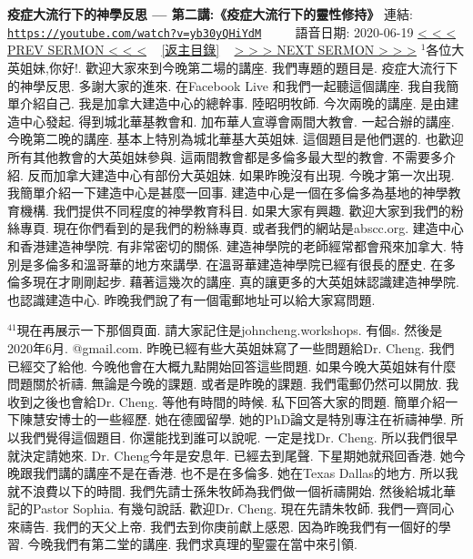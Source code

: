 \documentclass{book}
\begin{document}
\section{}
\label{sec:yb30yQHiYdM}
\textbf{疫症大流行下的神學反思 --- 第二講:《疫症大流行下的靈性修持》}
\newline
\newline
連結: \href{https://youtube.com/watch?v=yb30yQHiYdM}{\texttt{https://youtube.com/watch?v=yb30yQHiYdM}} ~~~~ 語音日期: 2020-06-19
\newline
\newline
\hyperref[sec:qcKLit3iF4o]{\small{< < < PREV SERMON < < <}}
~
\hyperref[sec:index]{\small{[返主目錄]}}
~
\hyperref[sec:fFkCm0QGBPw]{\small{> > > NEXT SERMON > > >}}
\newline
\newline
$^{1}$各位大英姐妹,你好!.
歡迎大家來到今晚第二場的講座.
我們專題的題目是.
疫症大流行下的神學反思.
多謝大家的進來.
在Facebook Live 和我們一起聽這個講座.
我自我簡單介紹自己.
我是加拿大建造中心的總幹事.
陸昭明牧師.
今次兩晚的講座.
是由建造中心發起.
得到城北華基教會和.
加布華人宣導會兩間大教會.
一起合辦的講座.
今晚第二晚的講座.
基本上特別為城北華基大英姐妹.
這個題目是他們選的.
也歡迎所有其他教會的大英姐妹參與.
這兩間教會都是多倫多最大型的教會.
不需要多介紹.
反而加拿大建造中心有部份大英姐妹.
如果昨晚沒有出現.
今晚才第一次出現.
我簡單介紹一下建造中心是甚麼一回事.
建造中心是一個在多倫多為基地的神學教育機構.
我們提供不同程度的神學教育科目.
如果大家有興趣.
歡迎大家到我們的粉絲專頁.
現在你們看到的是我們的粉絲專頁.
或者我們的網站是abscc.org.
建造中心和香港建造神學院.
有非常密切的關係.
建造神學院的老師經常都會飛來加拿大.
特別是多倫多和溫哥華的地方來講學.
在溫哥華建造神學院已經有很長的歷史.
在多倫多現在才剛剛起步.
藉著這幾次的講座.
真的讓更多的大英姐妹認識建造神學院.
也認識建造中心.
昨晚我們說了有一個電郵地址可以給大家寫問題.

$^{41}$現在再展示一下那個頁面.
請大家記住是johncheng.workshops.
有個s.
然後是2020年6月.
@gmail.com.
昨晚已經有些大英姐妹寫了一些問題給Dr. Cheng.
我們已經交了給他.
今晚他會在大概九點開始回答這些問題.
如果今晚大英姐妹有什麼問題關於祈禱.
無論是今晚的課題.
或者是昨晚的課題.
我們電郵仍然可以開放.
我收到之後也會給Dr. Cheng.
等他有時間的時候.
私下回答大家的問題.
簡單介紹一下陳慧安博士的一些經歷.
她在德國留學.
她的PhD論文是特別專注在祈禱神學.
所以我們覺得這個題目.
你還能找到誰可以說呢.
一定是找Dr. Cheng.
所以我們很早就決定請她來.
Dr. Cheng今年是安息年.
已經去到尾聲.
下星期她就飛回香港.
她今晚跟我們講的講座不是在香港.
也不是在多倫多.
她在Texas Dallas的地方.
所以我就不浪費以下的時間.
我們先請士孫朱牧師為我們做一個祈禱開始.
然後給城北華記的Pastor Sophia.
有幾句說話.
歡迎Dr. Cheng.
現在先請朱牧師.
我們一齊同心來禱告.
我們的天父上帝.
我們去到你庚前獻上感恩.
因為昨晚我們有一個好的學習.
今晚我們有第二堂的講座.
我們求真理的聖靈在當中來引領.
\end{document}
